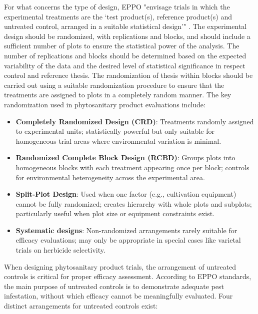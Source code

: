 \documentclass[12pt,a4paper,oneside]{report}
\begin{document}
For what concerns the type of design, EPPO "envisage trials in which the experimental
treatments are the ‘test product(s), reference product(s) and
untreated control, arranged in a suitable statistical design’" \cite{EPPO_PP1_152}.
The experimental design should be randomized, with replications and blocks, and
should include a sufficient number of plots to ensure the statistical power of the
analysis. The number of replications and blocks should be determined based on the
expected variability of the data and the desired level of statistical significance
in respect control and reference thesis. The
randomization of thesis within blocks should be carried out using a suitable
randomization procedure to ensure that the treatments are assigned to plots in a
completely random manner. The key randomization used in phytosanitary product 
evaluations include:

\begin{itemize}
    \item \textbf{Completely Randomized Design (CRD)}: Treatments randomly assigned to 
          experimental units; statistically powerful but only suitable for homogeneous trial 
          areas where environmental variation is minimal.
          
    \item \textbf{Randomized Complete Block Design (RCBD)}: Groups plots into homogeneous 
          blocks with each treatment appearing once per block; controls for environmental 
          heterogeneity across the experimental area.
          
    \item \textbf{Split-Plot Design}: Used when one factor (e.g., cultivation equipment) 
          cannot be fully randomized; creates hierarchy with whole plots and subplots; 
          particularly useful when plot size or equipment constraints exist.
          
    \item \textbf{Systematic designs}: Non-randomized arrangements rarely suitable for 
          efficacy evaluations; may only be appropriate in special cases like varietal 
          trials on herbicide selectivity.
\end{itemize}

When designing phytosanitary product trials, the arrangement of untreated controls 
is critical for proper efficacy assessment. According to EPPO standards, the main 
purpose of untreated controls is to demonstrate adequate pest infestation, without 
which efficacy cannot be meaningfully evaluated. Four distinct arrangements for 
untreated controls exist:
\end{document}
